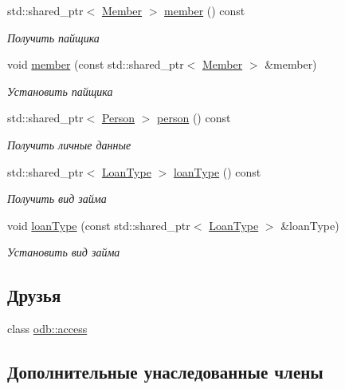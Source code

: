 \begin{DoxyCompactItemize}
std\+::shared\+\_\+ptr$<$ \hyperlink{classkpk_1_1data_1_1_member}{Member} $>$ \hyperlink{classkpk_1_1data_1_1_loan_a37fb3cc07280aa8310a32b4477b5528f}{member} () const 
\begin{DoxyCompactList}\small\item\em Получить пайщика \end{DoxyCompactList}\item 
void \hyperlink{classkpk_1_1data_1_1_loan_afecd269c6ce5285602760df1bce52a41}{member} (const std\+::shared\+\_\+ptr$<$ \hyperlink{classkpk_1_1data_1_1_member}{Member} $>$ \&member)
\begin{DoxyCompactList}\small\item\em Установить пайщика \end{DoxyCompactList}\item 
std\+::shared\+\_\+ptr$<$ \hyperlink{classkpk_1_1data_1_1_person}{Person} $>$ \hyperlink{classkpk_1_1data_1_1_loan_abace5ace0d55d9e640a1d96fcd5c389b}{person} () const 
\begin{DoxyCompactList}\small\item\em Получить личные данные \end{DoxyCompactList}\item 
std\+::shared\+\_\+ptr$<$ \hyperlink{classkpk_1_1data_1_1_loan_type}{Loan\+Type} $>$ \hyperlink{classkpk_1_1data_1_1_loan_a791850364c82ef161f09669c64bcc2a3}{loan\+Type} () const 
\begin{DoxyCompactList}\small\item\em Получить вид займа \end{DoxyCompactList}\item 
void \hyperlink{classkpk_1_1data_1_1_loan_a4f6570e5a76b24dfa70009b0b60283a6}{loan\+Type} (const std\+::shared\+\_\+ptr$<$ \hyperlink{classkpk_1_1data_1_1_loan_type}{Loan\+Type} $>$ \&loan\+Type)
\begin{DoxyCompactList}\small\item\em Установить вид займа \end{DoxyCompactList}\end{DoxyCompactItemize}
\subsection*{Друзья}
\begin{DoxyCompactItemize}
\item 
class \hyperlink{classkpk_1_1data_1_1_loan_acb4d953abf85ae525f1d06a0c3a86a55}{odb\+::access}
\end{DoxyCompactItemize}
\subsection*{Дополнительные унаследованные члены}



